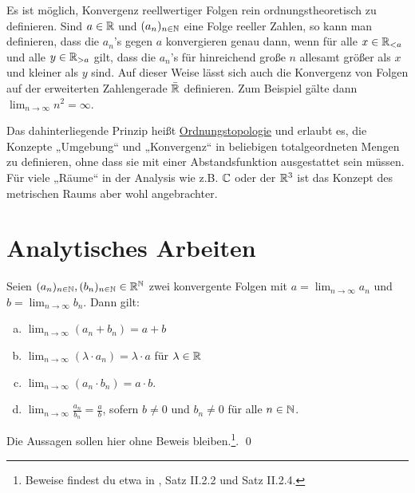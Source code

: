 \begin{vorschau}[* Ordnungstopologie]
    Es ist möglich, Konvergenz reellwertiger Folgen rein ordnungstheoretisch zu definieren. Sind $a\in \mathbb R$ und $(a_n)_{n\in \mathbb N}$ eine Folge reeller Zahlen, so kann man definieren, dass die $a_n$'s gegen $a$ konvergieren genau dann, wenn für alle $x\in \mathbb R_{<a}$ und alle $y\in \mathbb R_{>a}$ gilt, dass die $a_n$'s für hinreichend große $n$ allesamt größer als $x$ und kleiner als $y$ sind. Auf dieser Weise lässt sich auch die Konvergenz von Folgen auf der erweiterten Zahlengerade $\bar {\mathbb R}$ definieren. Zum Beispiel gälte dann $\lim_{n\to\infty} n^2=\infty$.
    
    Das dahinterliegende Prinzip heißt \href{https://de.wikipedia.org/wiki/Ordnungstopologie}{Ordnungstopologie} und erlaubt es, die Konzepte „Umgebung“ und „Konvergenz“ in beliebigen totalgeordneten Mengen zu definieren, ohne dass sie mit einer Abstandsfunktion ausgestattet sein müssen. Für viele „Räume“ in der Analysis wie z.B. $\mathbb C$ oder der $\mathbb R^3$ ist das Konzept des metrischen Raums aber wohl angebrachter.
\end{vorschau}





\section{Analytisches Arbeiten}


\begin{satz} \label{konvergenzregeln}
    Seien $(a_n)_{n\in \mathbb N},(b_n)_{n\in \mathbb N}\in \mathbb R^\mathbb N$ zwei konvergente Folgen mit $a=\lim_{n\to\infty}a_n$ und $b=\lim_{n\to\infty}b_n$. Dann gilt:
    \begin{enumerate}[a)]
        \item $\lim_{n\to\infty}(a_n+b_n)=a+b$
        \item $\lim_{n\to\infty}(\lambda \cdot a_n)=\lambda \cdot a$ für $\lambda\in\mathbb R$
        \item $\lim_{n\to\infty}(a_n\cdot b_n)=a\cdot b$.
        \item $\lim_{n\to\infty}\frac{a_n}{b_n} = \frac{a}{b}$, sofern $b\neq 0$ und $b_n\neq 0$ für alle $n\in \mathbb N$.
    \end{enumerate}
\end{satz}


\begin{bew}
    Die Aussagen sollen hier ohne Beweis bleiben.\footnote{Beweise findest du etwa in \cite{AE06}, Satz II.2.2 und Satz II.2.4.}. \qed
\end{bew}


